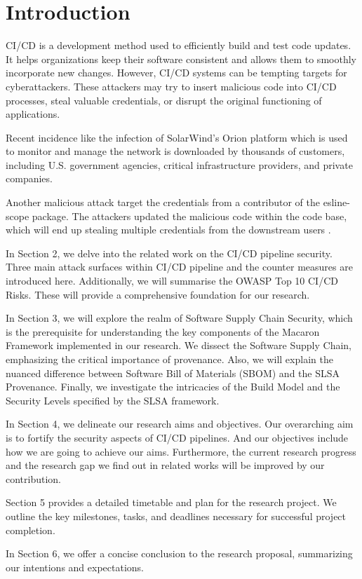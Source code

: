 \section{Introduction}
CI/CD is a development method used to efficiently build and test code updates. 
It helps organizations keep their software consistent and allows them to smoothly 
incorporate new changes. However, CI/CD systems can be tempting targets for cyberattackers. 
These attackers may try to insert malicious code into CI/CD processes, 
steal valuable credentials, or disrupt the original functioning of applications.

Recent incidence like the infection of SolarWind's Orion platform \cite{ladisa2023sok, 
peisert2021perspectives} which is used to monitor and manage the network is downloaded by 
thousands of customers, including U.S. government agencies, critical infrastructure providers, 
and private companies. 

Another malicious attack target the credentials from a contributor of the esline-scope package.
The attackers updated the malicious code within the code base, which will end up stealing
multiple credentials from the downstream users \cite{eslint2018}.

In Section 2, we delve into the related work on the CI/CD pipeline security. Three main 
attack surfaces within CI/CD pipeline and the counter measures are introduced here. 
Additionally, we will summarise the OWASP Top 10 CI/CD Risks. These will provide a comprehensive
foundation for our research. 

In Section 3, we will explore the realm of Software Supply Chain Security, which is the prerequisite
for understanding the key components of the Macaron Framework implemented in our research.
We dissect the Software Supply Chain, emphasizing the critical importance of provenance. 
Also, we will explain the nuanced difference between Software Bill of Materials (SBOM) and the SLSA Provenance.
Finally, we investigate the intricacies of the Build Model and the Security Levels specified by the SLSA framework.

In Section 4, we delineate our research aims and objectives. Our overarching aim is to fortify the security aspects of CI/CD pipelines. 
And our objectives include how we are going to achieve our aims. Furthermore, the current research 
progress and the research gap we find out in related works will be improved by our contribution.

Section 5 provides a detailed timetable and plan for the research project. 
We outline the key milestones, tasks, and deadlines necessary for successful project completion.

In Section 6, we offer a concise conclusion to the research proposal, summarizing our intentions and expectations.